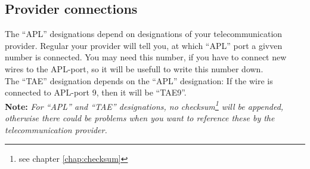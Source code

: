 %
%
%
%
%
%
%

\subsection{Provider connections}
\label{chap:spec_provider_conn}

The ``APL'' designations depend on designations of your telecommunication
provider. Regular your provider will tell you, at which ``APL'' port a givven
number is connected. You may need this number, if you have to connect new wires
to the APL-port, so it will be usefull to write this number down. \\

The ``TAE'' designation depends on the ``APL'' designation: If the wire is
connected to APL-port 9, then it will be ``TAE9''. \\

\textbf{Note:} \textit{For ``APL'' and ``TAE'' designations, no
checksum\footnote{\label{foot:checksum}see chapter \ref{chap:checksum}} will be
appended, otherwise there could be problems when you want to reference these by
the telecommunication provider.}
